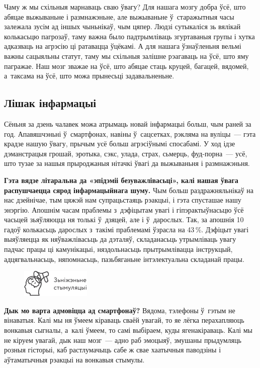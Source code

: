 Чаму ж мы схільныя марнаваць сваю ўвагу? Для нашага мозгу добра ўсё, што абяцае выжываньне і размнажэньне, але выжываньне ў~старажытныя часы залежала зусім ад іншых чыньнікаў, чым цяпер. Людзі сутыкаліся зь вялікай колькасьцю пагрозаў, таму важна было падтрымліваць згуртаваныя групы і хутка адказваць на агрэсію ці ратавацца ўцёкамі. А для нашага ўзнаўленьня вельмі важны сацыяльны статут, таму мы схільныя залішне рэагаваць на ўсё, што яму пагражае. Наш мозг зважае на ўсё, што абяцае стаць круцей, багацей, вядомей, а~таксама на ўсё, што можа прынесьці задавальненьне.

\subsection*{Лішак інфармацыі}

Сёньня за дзень чалавек можа атрымаць новай інфармацыі больш, чым раней за год. Апавяшчэньні ў~смартфонах, навіны ў~сацсетках, рэкляма на вуліцы~--- гэта крадзе нашую ўвагу, прычым усё больш агрэсіўнымі спосабамі. У ход ідзе дэманстрацыя грошай, эротыка, сэкс, улада, страх, сьмерць, фуд-порна~--- усё, што тузае за нашыя прыроджаныя нітачкі ўвагі да выжываньня і размнажэньня.

\textbf{Гэта вядзе літаральна да «эпідэміі безуважлівасьці», калі нашая ўвага распушчаецца сярод інфармацыйнага шуму.} Чым больш раздражняльнікаў на нас дзейнічае, тым цяжэй нам супрацьстаяць рэакцыі, і гэта спусташае нашу энэргію. Апошнім часам праблемы з~дэфіцытам увагі і гіпэрактыўнасьцю ўсё часьцей зьяўляюцца ня толькі ў~дзяцей, але і ў~дарослых. Так, за апошнія 10 гадоў колькасьць дарослых з~такімі праблемамі ўзрасла на 43\,\%. Дэфіцыт увагі выяўляецца як няўважлівасьць да дэталяў, складанасьць утрымліваць увагу падчас працы ці камунікацыі, няздольнасьць прытрымлівацца інструкцый, адцягвальнасьць, няпомнасьць, пазьбяганьне інтэлектуальна складанай працы.

\begin{figure}[htb!]
  \centering
  \includegraphics[scale=1.5]{willpower/ch8/5.pdf}
\end{figure}

\textbf{Дык мо варта адмовіцца ад смартфонаў?} Вядома, тэлефоны ў~гэтым не вінаватыя. Калі мы ня ўмеем кіраваць сваёй увагай, то яе лёгка перахапляюць вонкавыя сыгналы, а~калі ўмеем, то самі выбіраем, куды ягенакіраваць. Калі мы не кіруем увагай, дык наш мозг~--- адно раб эмоцыяў, змушаны прыдумляць розныя гісторыі, каб растлумачыць сабе ж свае хаатычныя паводзіны і аўтаматычныя рэакцыі на вонкавыя стымулы.

